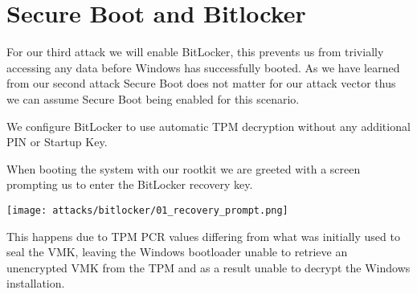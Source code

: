 \section{Secure Boot and Bitlocker}


For our third attack we will enable BitLocker, this prevents us from trivially accessing any data before Windows has successfully booted.
As we have learned from our second attack Secure Boot does not matter for our attack vector thus we can assume Secure Boot being enabled for this scenario.

We configure BitLocker to use automatic TPM decryption without any additional PIN or Startup Key.

When booting the system with our rootkit we are greeted with a screen prompting us to enter the BitLocker recovery key.

\texttt{[image: attacks/bitlocker/01\_recovery\_prompt.png]}

This happens due to TPM PCR values differing from what was initially used to seal the VMK, leaving the Windows bootloader unable to retrieve an unencrypted VMK from the TPM and as a result unable to decrypt the Windows installation. 



